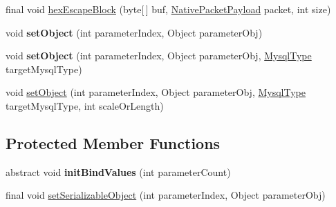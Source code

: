 \begin{DoxyCompactItemize}
\item 
final void \mbox{\hyperlink{classcom_1_1mysql_1_1cj_1_1_abstract_query_bindings_a013ed20b0641202207651a5aea06f215}{hex\+Escape\+Block}} (byte\mbox{[}$\,$\mbox{]} buf, \mbox{\hyperlink{classcom_1_1mysql_1_1cj_1_1protocol_1_1a_1_1_native_packet_payload}{Native\+Packet\+Payload}} packet, int size)
\item 
\mbox{\label{classcom_1_1mysql_1_1cj_1_1_abstract_query_bindings_a1dee6ee1875e05ebced2c60984c0c8e7}} 
void {\bfseries set\+Object} (int parameter\+Index, Object parameter\+Obj)
\item 
\mbox{\label{classcom_1_1mysql_1_1cj_1_1_abstract_query_bindings_a761eb9a0e429674a6fe9a4a29db29f8b}} 
void {\bfseries set\+Object} (int parameter\+Index, Object parameter\+Obj, \mbox{\hyperlink{enumcom_1_1mysql_1_1cj_1_1_mysql_type}{Mysql\+Type}} target\+Mysql\+Type)
\item 
void \mbox{\hyperlink{classcom_1_1mysql_1_1cj_1_1_abstract_query_bindings_a3a10937bc972e71cbf2b2ffde0578898}{set\+Object}} (int parameter\+Index, Object parameter\+Obj, \mbox{\hyperlink{enumcom_1_1mysql_1_1cj_1_1_mysql_type}{Mysql\+Type}} target\+Mysql\+Type, int scale\+Or\+Length)
\end{DoxyCompactItemize}
\subsection*{Protected Member Functions}
\begin{DoxyCompactItemize}
\item 
\mbox{\label{classcom_1_1mysql_1_1cj_1_1_abstract_query_bindings_a0640614206a5c3d6b9e5be8adcfb0d8d}} 
abstract void {\bfseries init\+Bind\+Values} (int parameter\+Count)
\item 
final void \mbox{\hyperlink{classcom_1_1mysql_1_1cj_1_1_abstract_query_bindings_a9ab53fee30aef97d392c20362be03608}{set\+Serializable\+Object}} (int parameter\+Index, Object parameter\+Obj)
\end{DoxyCompactItemize}
